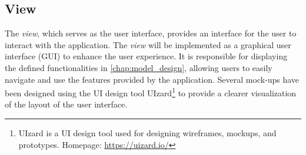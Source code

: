 \subsection{View}
\label{chap:view_design}
The \emph{view}, which serves as the user interface, provides an interface for the user to interact with the application. The \emph{view} will be implemented as a graphical user interface (GUI) to enhance the user experience. 
It is responsible for displaying the defined functionalities in \autoref{chap:model_design}, allowing users to easily navigate and use the features provided by the application. 
Several mock-ups have been designed using the UI design tool UIzard\footnote{UIzard is a UI design tool used for designing wireframes, mockups, and prototypes. Homepage: \url{https://uizard.io/}} to provide a clearer visualization of the layout of the user interface.

